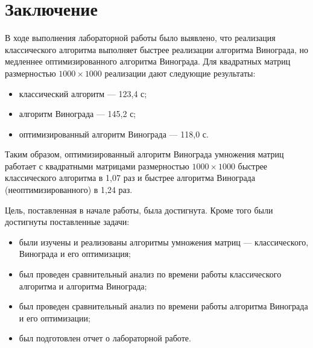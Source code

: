 \chapter*{Заключение}

В ходе выполнения лабораторной работы было выявлено, что реализация классического алгоритма выполняет быстрее реализации алгоритма Винограда, но медленнее оптимизированного алгоритма Винограда. Для квадратных матриц размерностью $1000\times1000$ реализации дают следующие результаты:
\begin{itemize}
	\item классический алгоритм --- 123,4 с;
	\item алгоритм Винограда --- 145,2 с;
	\item оптимизированный алгоритм Винограда --- 118,0 с.
\end{itemize}

Таким образом, оптимизированный алгоритм Винограда умножения матриц работает с квадратными матрицами размерностью $1000\times1000$ быстрее классического алгоритма в 1,07 раз и быстрее алгоритма Винограда (неоптимизированного) в 1,24 раз.

Цель, поставленная в начале работы, была достигнута. Кроме того были достигнуты поставленные задачи:
\begin{itemize}
	\item были изучены и реализованы алгоритмы умножения матриц --- классического, Винограда и его оптимизация;
	\item был проведен сравнительный анализ по времени работы классического алгоритма и алгоритма Винограда;
	\item  был проведен сравнительный анализ по времени работы алгоритма Винограда и его оптимизации;
	\item был подготовлен отчет о лабораторной работе.
\end{itemize}